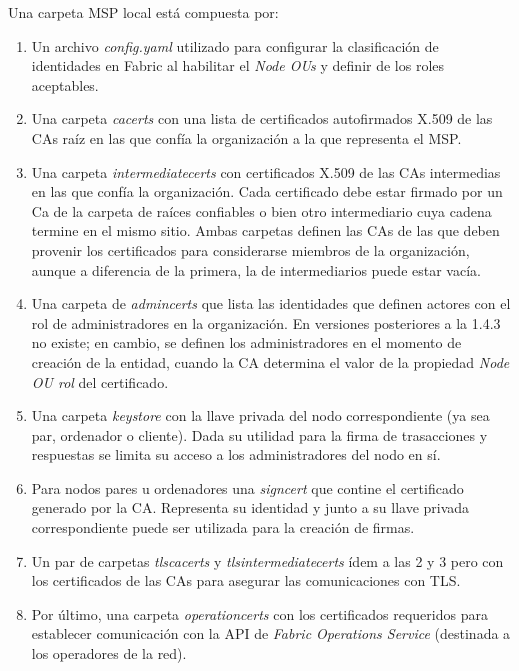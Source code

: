 Una carpeta MSP local est\'a compuesta por:

\begin{enumerate}
	\item Un archivo \emph{config.yaml} utilizado para configurar la clasificaci\'on de identidades en Fabric al habilitar el \emph{Node OUs} y definir de los roles aceptables.
	
	\item Una carpeta \emph{cacerts} con una lista de certificados autofirmados X.509 de las CAs ra\'iz en las que conf\'ia la organizaci\'on a la que representa el MSP.
	
	\item Una carpeta \emph{intermediatecerts} con certificados X.509 de las CAs intermedias en las que conf\'ia la organizaci\'on. Cada certificado debe estar firmado por un Ca de la carpeta de ra\'ices confiables o bien otro intermediario cuya cadena termine en el mismo sitio. Ambas carpetas definen las CAs de las que deben provenir los certificados para considerarse miembros de la organizaci\'on, aunque a diferencia de la primera, la de intermediarios puede estar vac\'ia.
	
	\item Una carpeta de \emph{admincerts} que lista las identidades que definen actores con el rol de administradores en la organizaci\'on. En versiones posteriores a la 1.4.3 no existe; en cambio, se definen los administradores en el momento de creaci\'on de la entidad, cuando la CA determina el valor de la propiedad \emph{Node OU rol} del certificado.
	
	
	\item Una carpeta \emph{keystore} con la llave privada del nodo correspondiente (ya sea par, ordenador o cliente). Dada su utilidad para la firma de trasacciones y respuestas se limita su acceso a los administradores del nodo en s\'i. 
	
	\item Para nodos pares u ordenadores una \emph{signcert} que contine el certificado generado por la CA. Representa su identidad y junto a su llave privada correspondiente puede ser utilizada para la creaci\'on de firmas.
	
	\item Un par de carpetas \emph{tlscacerts} y \emph{tlsintermediatecerts} \'idem a las 2 y 3 pero con los certificados de las CAs para asegurar las comunicaciones con TLS.
	
	\item Por \'ultimo, una carpeta \emph{operationcerts} con los certificados requeridos para establecer comunicaci\'on con la API de \emph{Fabric Operations Service} (destinada a los operadores de la red).
\end{enumerate}


